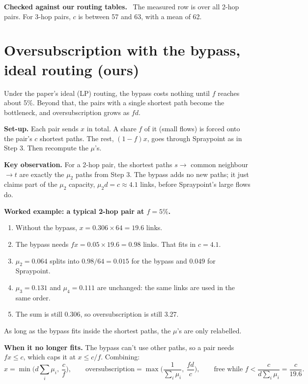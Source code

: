 \documentclass[11pt]{article}
\newcommand{\SigmaMu}{\textstyle\sum_i \mu_i}
\newenvironment{checked}
  {\par\smallskip\noindent\begin{lrbox}{\checkedbox}%
   \begin{minipage}{\dimexpr\linewidth-2\fboxsep\relax}%
   \textbf{Checked against our routing tables.}\ }
  {\end{minipage}\end{lrbox}\colorbox{black!5}{\usebox{\checkedbox}}\par\smallskip}
\begin{document}
\begin{checked}
The measured row is over all 2-hop pairs. For 3-hop pairs, $c$ is between 57 and 63, with a mean of 62.
\end{checked}

\section{Oversubscription with the bypass, ideal routing (ours)}

Under the paper's ideal (LP) routing, the bypass costs nothing until $f$ reaches about 5\%. Beyond that, the pairs with a single shortest path become the bottleneck, and oversubscription grows as $f d$.

\textbf{Set-up.} Each pair sends $x$ in total. A share $f$ of it (small flows) is forced onto the pair's $c$ shortest paths. The rest, $(1 - f) x$, goes through Spraypoint as in Step 3. Then recompute the $\mu$'s.

\textbf{Key observation.} For a 2-hop pair, the shortest paths $s \to$ common neighbour $\to t$ are exactly the $\mu_2$ paths from Step 3. The bypass adds no new paths; it just claims part of the $\mu_2$ capacity, $\mu_2 d = c \approx 4.1$ links, before Spraypoint's large flows do.

\textbf{Worked example: a typical 2-hop pair at $f = 5\%$.}
\begin{enumerate}
  \item Without the bypass, $x = 0.306 \times 64 = 19.6$ links.
  \item The bypass needs $f x = 0.05 \times 19.6 = 0.98$ links. That fits in $c = 4.1$.
  \item $\mu_2 = 0.064$ splits into $0.98/64 = 0.015$ for the bypass and $0.049$ for Spraypoint.
  \item $\mu_3 = 0.131$ and $\mu_4 = 0.111$ are unchanged: the same links are used in the same order.
  \item The sum is still 0.306, so oversubscription is still 3.27.
\end{enumerate}
As long as the bypass fits inside the shortest paths, the $\mu$'s are only relabelled.

\textbf{When it no longer fits.} The bypass can't use other paths, so a pair needs $f x \le c$, which caps it at $x \le c/f$. Combining:
\[
x = \min\!\Big( d \SigmaMu,\ \frac{c}{f} \Big),
\qquad
\text{oversubscription} = \max\!\Big( \frac{1}{\SigmaMu},\ \frac{f d}{c} \Big),
\qquad
\text{free while } f < \frac{c}{d \SigmaMu} = \frac{c}{19.6}.
\]
\end{document}
